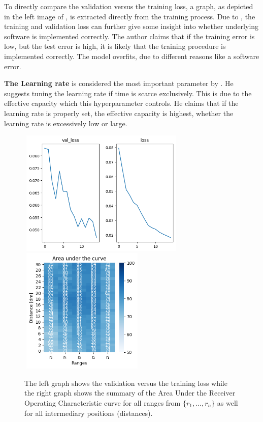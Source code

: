 To directly compare the validation versus the training loss, a graph, as depicted in the left image of , is extracted directly from the training process. Due to \cite{Goodfellow-et-al-2016}, the training and validation loss can further give some insight into whether underlying software is implemented correctly. The author claims that if the training error is low, but the test error is high, it is likely that the training procedure is implemented correctly. The model overfits, due to different reasons like a software error.

\textbf{The Learning rate} is considered the most important parameter by \cite{Goodfellow-et-al-2016}. He suggests tuning the learning rate if time is scarce exclusively. This is due to the effective capacity which this hyperparameter controls. He claims that if the learning rate is properly set, the effective capacity is highest, whether the learning rate is excessively low or large.

\begin{figure}[H]%
\centering
\includegraphics[width=8cm,height=6cm]{3_models/models_10/graph_10.png}
\hspace{0.2 cm}
\includegraphics[width=6cm,height=6cm]{4_plots/plots_10/AUC_10.png}
\caption{The left graph shows the validation versus the training loss while the right graph shows the summary of the Area Under the Receiver Operating Characteristic curve for all ranges from $\{r_{1}, ... ,r_{n}\}$ as well for all intermediary positions (distances).}
\label{train_val}
\end{figure}

